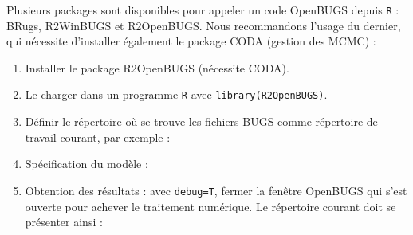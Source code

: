 Plusieurs packages sont disponibles pour appeler un code OpenBUGS depuis \texttt{R} : BRugs, R2WinBUGS et R2OpenBUGS. Nous recommandons l'usage du dernier, qui nécessite d'installer également le package CODA (gestion des MCMC) :
\begin{enumerate}
    \item  Installer le package R2OpenBUGS {(nécessite CODA)}.
    \item Le charger dans un programme \texttt{R} avec \texttt{library(R2OpenBUGS)}.
    \item Définir le répertoire où se trouve les fichiers BUGS comme répertoire de travail courant, par exemple :
    \begin{center} 
 \end{center}
 \item Spécification du modèle :
   \begin{center} 
 \end{center}
  \item Obtention des résultats : avec \texttt{debug=T}, fermer la fenêtre OpenBUGS qui s'est ouverte pour achever le traitement numérique. Le répertoire courant doit se présenter ainsi : 
   \begin{center} 
 \end{center}
\end{enumerate}

